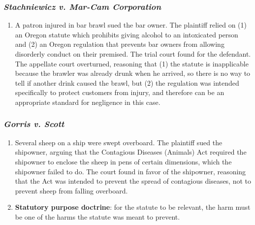 \subsubsection{\emph{Stachniewicz v. Mar-Cam Corporation}}

\begin{enumerate}
    \item A patron injured in bar brawl sued the bar owner. The plaintiff 
    relied on (1) an Oregon statute which prohibits giving alcohol to an 
    intoxicated person and (2) an Oregon regulation that prevents bar owners 
    from allowing disorderly conduct on their premised. The trial court found 
    for the defendant. The appellate court overturned, reasoning that (1) the 
    statute is inapplicable because the brawler was already drunk when he 
    arrived, so there is no way to tell if another drink caused the brawl, but 
    (2) the regulation was intended specifically to protect customers from 
    injury, and therefore can be an appropriate standard for negligence in 
    this case.
\end{enumerate}

\subsubsection{\emph{Gorris v. Scott}}

\begin{enumerate}
    \item Several sheep on a ship were swept overboard. The plaintiff sued the 
    shipowner, arguing that the Contagious Diseases (Animals) Act required the 
    shipowner to enclose the sheep in pens of certain dimensions, which the 
    shipowner failed to do. The court found in favor of the shipowner, 
    reasoning that the Act was intended to prevent the spread of contagious 
    diseases, not to prevent sheep from falling overboard.
    \item \textbf{Statutory purpose doctrine}: for the statute to be relevant, 
    the harm must be one of the harms the statute was meant to prevent.
\end{enumerate}

